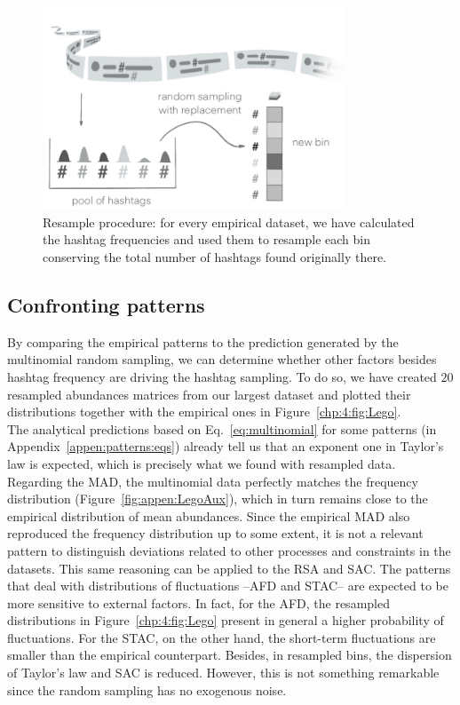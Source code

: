 \begin{figure}[t]
    \centering
    \includegraphics[width=0.8\textwidth]{figures/chp4/randomSampling.pdf}
    \caption[Multinomial random sampling of posts]{Resample procedure: for every empirical dataset, we have calculated the hashtag frequencies and used them to resample each bin conserving the total number of hashtags found originally there.}
    \label{fig:4:randomSampling}
\end{figure}

\subsection{Confronting patterns}
By comparing the empirical patterns to the prediction generated by the multinomial random sampling, we can determine whether other factors besides hashtag frequency are driving the hashtag sampling. To do so, we have created $20$ resampled abundances matrices from our largest dataset and plotted their distributions together with the empirical ones in Figure~\ref{chp:4:fig:Lego}.\\

The analytical predictions based on Eq.~\ref{eq:multinomial} for some patterns (in Appendix~\ref{appen:patterns:eqs}) already tell us that an exponent one in Taylor's law is expected, which is precisely what we found with resampled data. Regarding the MAD, the multinomial data perfectly matches the frequency distribution (Figure~\ref{fig:appen:LegoAux}), which in turn remains close to the empirical distribution of mean abundances. Since the empirical MAD also reproduced the frequency distribution up to some extent, it is not a relevant pattern to distinguish deviations related to other processes and constraints in the datasets. This same reasoning can be applied to the RSA and SAC. The patterns that deal with distributions of fluctuations --AFD and STAC-- are expected to be more sensitive to external factors. In fact, for the AFD, the resampled distributions in Figure~\ref{chp:4:fig:Lego} present in general a higher probability of fluctuations. For the STAC, on the other hand, the short-term fluctuations are smaller than the empirical counterpart. Besides, in resampled bins, the dispersion of Taylor's law and SAC is reduced. However, this is not something remarkable since the random sampling has no exogenous noise. \\

